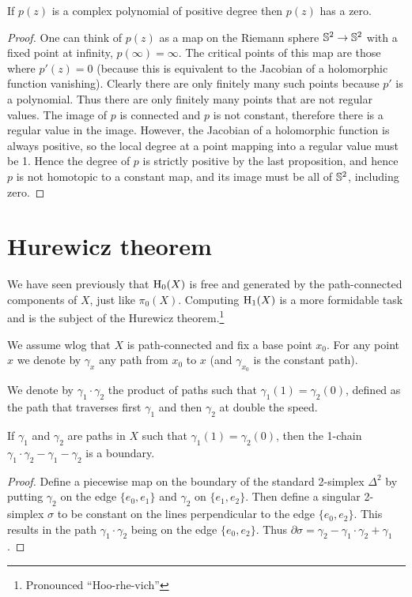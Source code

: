 \begin{cor}
    If $p(z)$ is a complex polynomial of positive degree then $p(z)$ has a zero.
\end{cor}
\begin{proof}
     One can think of $p(z)$ as a map on the Riemann sphere $\mathbb{S}^2\to \mathbb{S}^2$ with a fixed point at infinity, $p(\infty)=\infty$. The critical points of this map are those where $p'(z)=0$ (because this is equivalent to the Jacobian of a holomorphic function vanishing). Clearly there are only finitely many such points because $p'$ is a polynomial. Thus there are only finitely many points that are not regular values. The image of $p$ is connected and $p$ is not constant, therefore there is a regular value in the image. However, the Jacobian of a holomorphic function is always positive, so the local degree at a point mapping into a regular value must be 1. Hence the degree of $p$ is strictly positive by the last proposition, and hence $p$ is not homotopic to a constant map, and its image must be all of $\mathbb{S}^2$, including zero.
\end{proof}



\section{Hurewicz theorem}

We have seen previously that $\mathrm{H}_0(X)$ is free and generated by the path-connected components of $X$, just like $\pi_0(X)$. Computing $\mathrm{H}_1(X)$ is a more formidable task and is the subject of the Hurewicz theorem.\footnote{Pronounced ``Hoo-rhe-vich''}

We assume \gls{wlog} that $X$ is path-connected and fix a base point $x_0$. For any point $x$ we denote by $\gamma_x$ any path from $x_0$ to $x$ (and $\gamma_{x_0}$ is the constant path).

We denote by $\gamma_1\cdot \gamma_2$ the product of paths such that $\gamma_1(1)=\gamma_2(0)$, defined as the path that traverses first $\gamma_1$ and then $\gamma_2$ at double the speed.

\begin{lem}
    If $\gamma_1$ and $\gamma_2$ are paths in $X$ such that $\gamma_1(1)=\gamma_2(0)$, then the 1-chain $\gamma_1\cdot\gamma_2-\gamma_1-\gamma_2$ is a boundary.
\end{lem}
\begin{proof}
     Define a piecewise map on the boundary of the standard 2-simplex $\Delta^2$ by putting $\gamma_2$ on the edge $\{e_0,e_1\}$ and $\gamma_2$ on $\{e_1,e_2\}$. Then define a singular 2-simplex $\sigma$ to be constant on the lines perpendicular to the edge $\{e_0,e_2\}$. This results in the path $\gamma_1\cdot\gamma_2$ being on the edge $\{e_0,e_2\}$. Thus $\partial\sigma=\gamma_2-\gamma_1\cdot\gamma_2+\gamma_1$.
\end{proof}

